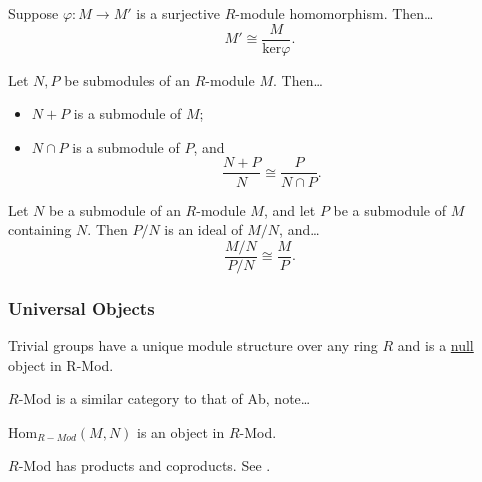\begin{corollary}
Suppose $\varphi : M \rightarrow M'$ is a surjective $R$-module homomorphism. Then\dots
$$M' \cong \frac{M}{\textrm{ker}\varphi}.$$
\end{corollary}

\begin{theorem}
Let $N,P$ be submodules of an $R$-module $M$. Then\dots
\begin{itemize}
  \item $N + P$ is a submodule of $M$;
  \item $N \cap P$ is a submodule of $P$, and
  			$$\frac{N + P}{N} \cong \frac{P}{N \cap P}.$$
\end{itemize}
\end{theorem}

\begin{theorem}
Let $N$ be a submodule of an $R$-module $M$, and let $P$ be a submodule of $M$ containing $N$. Then $P/N$ is an ideal of $M/N$,
and\dots
$$\frac{M/N}{P/N} \cong \frac{M}{P}.$$
\end{theorem}

\subsubsection{Universal Objects}

\begin{proposition}
Trivial groups have a unique module structure over any ring $R$ and is a \hyperref[null]{null} object in R-Mod.
\end{proposition}

\noindent $R$-Mod is a similar category to that of Ab, note\dots

\begin{proposition}
Hom$_{R-Mod}(M,N)$ is an object in $R$-Mod.
\end{proposition}

\begin{proposition}
$R$-Mod has products and coproducts. See \hyperref[productmodules]{}.
\end{proposition}